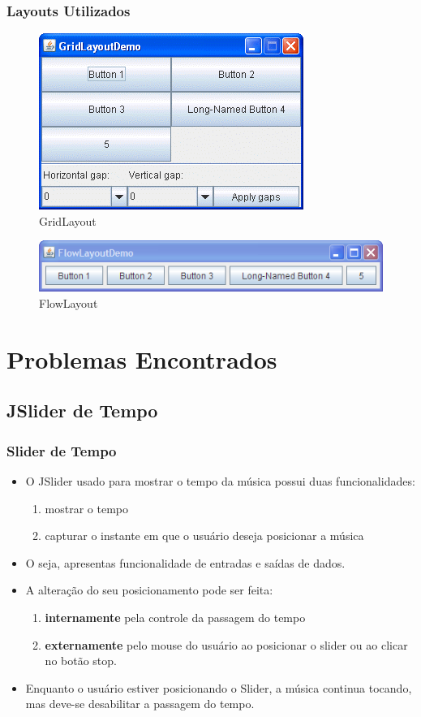 \documentclass{beamer}
\begin{document}
\begin{frame}
 \frametitle{Layouts Utilizados}
 \begin{figure}
  \includegraphics[scale=0.5]{./images/GridLayout.png}
  \caption{GridLayout}
 \end{figure}
 
 \begin{figure}
  \includegraphics[scale=0.5]{./images/FlowLayout.png}
  \caption{FlowLayout}
 \end{figure} 

\end{frame}



\section{Problemas Encontrados}
\subsection{JSlider de Tempo}
\begin{frame}
    \frametitle{Slider de Tempo}
    \begin{itemize}
     \item O JSlider usado para mostrar o tempo da música possui duas funcionalidades:
     \begin{enumerate}
      \item mostrar o tempo
      \item capturar o instante em que o usuário deseja posicionar a música
     \end{enumerate}
     \item O seja, apresentas funcionalidade de entradas e saídas de dados.
     \item A alteração do seu posicionamento pode ser feita:
     \begin{enumerate}
      \item \textbf{internamente} pela controle da passagem do tempo
      \item \textbf{externamente} pelo mouse do usuário ao posicionar o slider ou ao clicar no botão stop.
     \end{enumerate}
    \item Enquanto o usuário estiver posicionando o Slider, a música continua tocando, mas deve-se desabilitar
    a passagem do tempo.
    \end{itemize}
    \end{frame}
\end{document}
